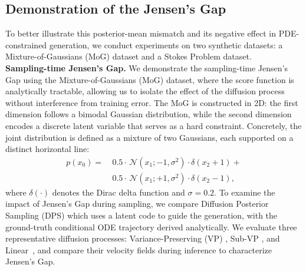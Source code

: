 \documentclass{article}
\theoremstyle{plain}
\theoremstyle{definition}
\theoremstyle{remark}
\begin{document}
\subsection{Demonstration of the Jensen’s Gap}\label{sec:jensengap-demo}

To better illustrate this posterior-mean mismatch and its negative effect in PDE-constrained generation, we conduct experiments on two synthetic datasets: a Mixture-of-Gaussians (MoG) dataset and a Stokes Problem dataset.\\
\noindent\textbf{Sampling-time Jensen’s Gap.}
We demonstrate the sampling-time Jensen’s Gap using the Mixture-of-Gaussians (MoG) dataset, where the score function is analytically tractable, allowing us to isolate the effect of the diffusion process without interference from training error. The MoG is constructed in 2D: the first dimension follows a bimodal Gaussian distribution, while the second dimension encodes a discrete latent variable that serves as a hard constraint. Concretely, the joint distribution is defined as a mixture of two Gaussians, each supported on a distinct horizontal line:
\begin{align*}
p(x_0) = &\ 0.5 \cdot \, \mathcal{N}(x_1; -1, \sigma^2) \cdot \delta(x_2 + 1) + \\
&\ 0.5 \cdot \, \mathcal{N}(x_1; +1, \sigma^2) \cdot \delta(x_2 - 1),
\end{align*}
where $\delta(\cdot)$ denotes the Dirac delta function and $\sigma=0.2$. To examine the impact of Jensen’s Gap during sampling, we compare Diffusion Posterior Sampling (DPS) \cite{chung2022dps} which uses a latent code to guide the generation, with the ground-truth conditional ODE trajectory derived analytically.
We evaluate three representative diffusion processes: Variance-Preserving (VP) \cite{ho2020ddpm}, Sub-VP \cite{song2020score}, and Linear~\cite{liu2023flow}, and compare their velocity fields during inference to characterize Jensen's Gap.
\end{document}
